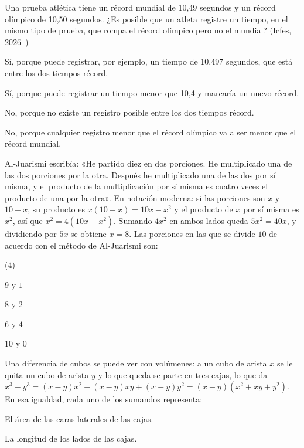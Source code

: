 \documentclass[11pt]{article}
\begin{document}
\begin{preguntas}
\pregunta Una prueba atlética tiene un récord mundial de 10,49 segundos y un
récord olímpico de 10,50 segundos. ¿Es posible que un atleta registre un
tiempo, en el mismo tipo de prueba, que rompa el récord olímpico pero no el
mundial? {\small (Icfes, 2026~\cite{icfes})}
\begin{opciones}
  \item Sí, porque puede registrar, por ejemplo, un tiempo de 10,497
        segundos, que está entre los dos tiempos récord.
  \item Sí, porque puede registrar un tiempo menor que 10,4 y marcaría un
        nuevo récord.
  \item No, porque no existe un registro posible entre los dos tiempos
        récord.
  \item No, porque cualquier registro menor que el récord olímpico va a ser
        menor que el récord mundial.
\end{opciones}
\pregunta Al-Juarismi escribía: «He partido diez en dos porciones. He
multiplicado una de las dos porciones por la otra. Después he multiplicado
una de las dos por sí misma, y el producto de la multiplicación por sí misma
es cuatro veces el producto de una por la otra». En notación moderna: si las
porciones son $x$ y $10 - x$, su producto es $x(10 - x) = 10x - x^2$ y el
producto de $x$ por sí misma es $x^2$, así que $x^2 = 4(10x - x^2)$. Sumando
$4x^2$ en ambos lados queda $5x^2 = 40x$, y dividiendo por $5x$ se obtiene
$x = 8$. Las porciones en las que se divide $10$ de acuerdo con el método de
Al-Juarismi son:
\begin{opciones*}(4)
  \item $9$ y $1$
  \item $8$ y $2$
  \item $6$ y $4$
  \item $10$ y $0$
\end{opciones*}
\pregunta Una diferencia de cubos se puede ver con volúmenes: a un cubo de
arista $x$ se le quita un cubo de arista $y$ y lo que queda se parte en tres
cajas, lo que da
$x^3 - y^3 = (x - y)x^2 + (x - y)xy + (x - y)y^2 = (x - y)\left(x^2 + xy + y^2\right)$.
En esa igualdad, cada uno de los sumandos representa:
\begin{opciones}
  \item El área de las caras laterales de las cajas.
  \item La longitud de los lados de las cajas.

\end{opciones}
\end{preguntas}
\end{document}
